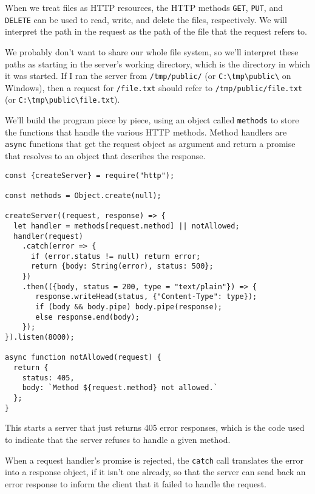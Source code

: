 When we treat files as HTTP resources, the HTTP methods \lstinline`GET`, \lstinline`PUT`, and \lstinline`DELETE` can be used to read, write, and delete the files, respectively. We will interpret the path in the request as the path of the file that the request refers to.

We probably don't want to share our whole file system, so we'll interpret these paths as starting in the server's working directory, which is the directory in which it was started. If I ran the server from \lstinline`/tmp/public/` (or \lstinline`C:\tmp\public\` on Windows), then a request for \lstinline`/file.txt` should refer to \lstinline`/tmp/public/file.txt` (or \lstinline`C:\tmp\public\file.txt`).

We'll build the program piece by piece, using an object called \lstinline`methods` to store the functions that handle the various HTTP methods. Method handlers are \lstinline`async` functions that get the request object as argument and return a promise that resolves to an object that describes the response.

\begin{lstlisting}
const {createServer} = require("http");

const methods = Object.create(null);

createServer((request, response) => {
  let handler = methods[request.method] || notAllowed;
  handler(request)
    .catch(error => {
      if (error.status != null) return error;
      return {body: String(error), status: 500};
    })
    .then(({body, status = 200, type = "text/plain"}) => {
       response.writeHead(status, {"Content-Type": type});
       if (body && body.pipe) body.pipe(response);
       else response.end(body);
    });
}).listen(8000);

async function notAllowed(request) {
  return {
    status: 405,
    body: `Method ${request.method} not allowed.`
  };
}
\end{lstlisting}
\noindent{}

This starts a server that just returns 405 error responses, which is the code used to indicate that the server refuses to handle a given method.

When a request handler's promise is rejected, the \lstinline`catch` call translates the error into a response object, if it isn't one already, so that the server can send back an error response to inform the client that it failed to handle the request.

